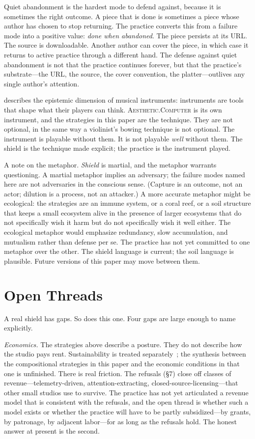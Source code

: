 \documentclass[10pt,letterpaper,twocolumn]{article}
\newcommand{\ac}{\textsc{Aesthetic.Computer}}
\begin{document}
Quiet abandonment is the hardest mode to defend against, because it is sometimes the right outcome. A piece that is done is sometimes a piece whose author has chosen to stop returning. The practice converts this from a failure mode into a positive value: \emph{done when abandoned}. The piece persists at its URL. The source is downloadable. Another author can cover the piece, in which case it returns to active practice through a different hand. The defense against quiet abandonment is not that the practice continues forever, but that the practice's substrate---the URL, the source, the cover convention, the platter---outlives any single author's attention.

\citet{magnusson2010designing} describes the epistemic dimension of musical instruments: instruments are tools that shape what their players can think. \ac{} is its own instrument, and the strategies in this paper are the technique. They are not optional, in the same way a violinist's bowing technique is not optional. The instrument is playable without them. It is not playable \emph{well} without them. The shield is the technique made explicit; the practice is the instrument played.

A note on the metaphor. \emph{Shield} is martial, and the metaphor warrants questioning. A martial metaphor implies an adversary; the failure modes named here are not adversaries in the conscious sense. (Capture is an outcome, not an actor; dilution is a process, not an attacker.) A more accurate metaphor might be ecological: the strategies are an immune system, or a coral reef, or a soil structure that keeps a small ecosystem alive in the presence of larger ecosystems that do not specifically wish it harm but do not specifically wish it well either. The ecological metaphor would emphasize redundancy, slow accumulation, and mutualism rather than defense per se. The practice has not yet committed to one metaphor over the other. The shield language is current; the soil language is plausible. Future versions of this paper may move between them.

\section{Open Threads}

A real shield has gaps. So does this one. Four gaps are large enough to name explicitly.

\emph{Economics.} The strategies above describe a posture. They do not describe how the studio pays rent. Sustainability is treated separately~\citep{scudder2026sustainability}; the synthesis between the compositional strategies in this paper and the economic conditions in that one is unfinished. There is real friction. The refusals (\S7) close off classes of revenue---telemetry-driven, attention-extracting, closed-source-licensing---that other small studios use to survive. The practice has not yet articulated a revenue model that is consistent with the refusals, and the open thread is whether such a model exists or whether the practice will have to be partly subsidized---by grants, by patronage, by adjacent labor---for as long as the refusals hold. The honest answer at present is the second.
\end{document}
